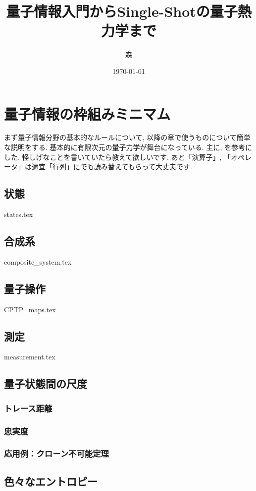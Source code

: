 \documentclass[report]{jlreq}
\title{量子情報入門からSingle-Shotの量子熱力学まで}
\author{森}
\date{\today}
\begin{document}
\maketitle

\setcounter{tocdepth}{1}
\thispagestyle{TOC}
\tableofcontents


\pagestyle{mystyle}
\chapter{量子情報の枠組みミニマム}
まず量子情報分野の基本的なルールについて, 以降の章で使うものについて簡単な説明をする. 
基本的に有限次元の量子力学が舞台になっている. 
主に\cite{nielsen2010quantum}, \cite{SagawaEntropy}を参考にした. 
怪しげなことを書いていたら教えて欲しいです. 
あと「演算子」, 「オペレータ」は適宜「行列」にでも読み替えてもらって大丈夫です. 
\section{状態}
{states.tex}
\section{合成系}
{composite_system.tex}
\section{量子操作}
{CPTP_maps.tex}
\section{測定}
{measurement.tex}
\section{量子状態間の尺度}
\subsection{トレース距離}
\subsection{忠実度}
\subsection{応用例：クローン不可能定理}
\section{色々なエントロピー}
\end{document}
